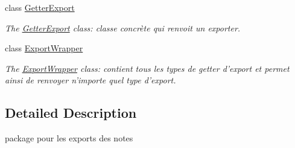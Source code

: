 \begin{DoxyCompactItemize}
class \hyperlink{classexport__notes_1_1_getter_export}{Getter\-Export}
\begin{DoxyCompactList}\small\item\em The \hyperlink{classexport__notes_1_1_getter_export}{Getter\-Export} class\-: classe concrète qui renvoit un exporter. \end{DoxyCompactList}\item 
class \hyperlink{classexport__notes_1_1_export_wrapper}{Export\-Wrapper}
\begin{DoxyCompactList}\small\item\em The \hyperlink{classexport__notes_1_1_export_wrapper}{Export\-Wrapper} class\-: contient tous les types de getter d'export et permet ainsi de renvoyer n'importe quel type d'export. \end{DoxyCompactList}\end{DoxyCompactItemize}


\subsection{Detailed Description}
package pour les exports des notes 